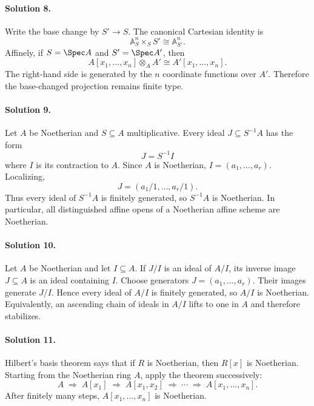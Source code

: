 \paragraph{Solution 8.}
Write the base change by \(S'\to S\).  The canonical Cartesian identity is
\[
\mathbb A^n_S\times_S S'\cong \mathbb A^n_{S'}.
\]
Affinely, if \(S=\Spec A\) and \(S'=\Spec A'\), then
\[
A[x_1,\ldots,x_n]\otimes_A A'
\cong
A'[x_1,\ldots,x_n].
\]
The right-hand side is generated by the \(n\) coordinate functions over \(A'\).  Therefore the
base-changed projection remains finite type.

\paragraph{Solution 9.}
Let \(A\) be Noetherian and \(S\subseteq A\) multiplicative.  Every ideal \(J\subseteq S^{-1}A\)
has the form
\[
J=S^{-1}I
\]
where \(I\) is its contraction to \(A\).  Since \(A\) is Noetherian,
\(I=(a_1,\ldots,a_r)\).  Localizing,
\[
J=(a_1/1,\ldots,a_r/1).
\]
Thus every ideal of \(S^{-1}A\) is finitely generated, so \(S^{-1}A\) is Noetherian.  In particular,
all distinguished affine opens of a Noetherian affine scheme are Noetherian.

\paragraph{Solution 10.}
Let \(A\) be Noetherian and let \(I\subseteq A\).  If \(J/I\) is an ideal of \(A/I\), its inverse
image \(J\subseteq A\) is an ideal containing \(I\).  Choose generators
\(J=(a_1,\ldots,a_r)\).  Their images generate \(J/I\).  Hence every ideal of \(A/I\) is finitely
generated, so \(A/I\) is Noetherian.  Equivalently, an ascending chain of ideals in \(A/I\) lifts
to one in \(A\) and therefore stabilizes.

\paragraph{Solution 11.}
Hilbert's basis theorem says that if \(R\) is Noetherian, then \(R[x]\) is Noetherian.  Starting from
the Noetherian ring \(A\), apply the theorem successively:
\[
A\;\Longrightarrow\;A[x_1]\;\Longrightarrow\;
A[x_1,x_2]\;\Longrightarrow\;\cdots\;\Longrightarrow\;
A[x_1,\ldots,x_n].
\]
After finitely many steps, \(A[x_1,\ldots,x_n]\) is Noetherian.

